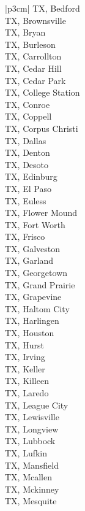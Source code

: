 \begin{customLongTable}{ |p{3cm}| }
TX, Bedford \\ \hline
TX, Brownsville \\ \hline
TX, Bryan \\ \hline
TX, Burleson \\ \hline
TX, Carrollton \\ \hline
TX, Cedar Hill \\ \hline
TX, Cedar Park \\ \hline
TX, College Station \\ \hline
TX, Conroe \\ \hline
TX, Coppell \\ \hline
TX, Corpus Christi \\ \hline
TX, Dallas \\ \hline
TX, Denton \\ \hline
TX, Desoto \\ \hline
TX, Edinburg \\ \hline
TX, El Paso \\ \hline
TX, Euless \\ \hline
TX, Flower Mound \\ \hline
TX, Fort Worth \\ \hline
TX, Frisco \\ \hline
TX, Galveston \\ \hline
TX, Garland \\ \hline
TX, Georgetown \\ \hline
TX, Grand Prairie \\ \hline
TX, Grapevine \\ \hline
TX, Haltom City \\ \hline
TX, Harlingen \\ \hline
TX, Houston \\ \hline
TX, Hurst \\ \hline
TX, Irving \\ \hline
TX, Keller \\ \hline
TX, Killeen \\ \hline
TX, Laredo \\ \hline
TX, League City \\ \hline
TX, Lewisville \\ \hline
TX, Longview \\ \hline
TX, Lubbock \\ \hline
TX, Lufkin \\ \hline
TX, Mansfield \\ \hline
TX, Mcallen \\ \hline
TX, Mckinney \\ \hline
TX, Mesquite \\ \hline

\end{customLongTable}
